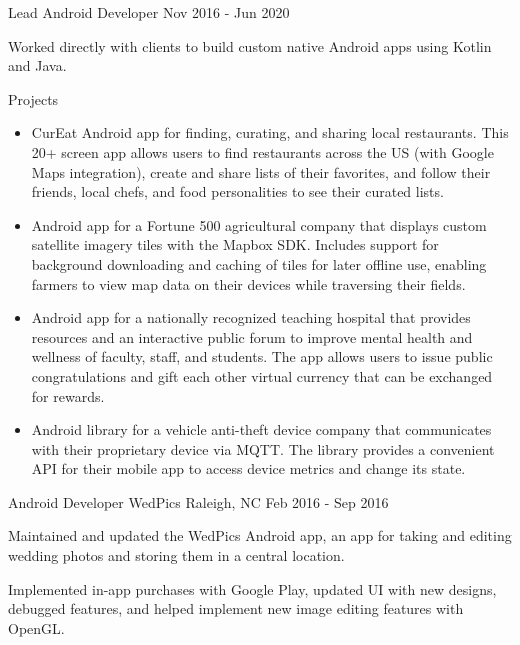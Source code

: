 \begin{cventries}
  \cventry
    {Lead Android Developer} %
    {} %
    {} %
    {Nov 2016 - Jun 2020} %
    {
      \begin{cvitems} %
        \item {Worked directly with clients to build custom native Android apps using Kotlin and Java.}
        \item {Projects
          \begin{itemize}[leftmargin=2ex, nosep, noitemsep]
          \setlength{\parskip}{0pt}
            \item {CurEat Android app for finding, curating, and sharing local restaurants. This 20+ screen app allows users to find restaurants across the US (with Google Maps integration), create and share lists of their favorites, and follow their friends, local chefs, and food personalities to see their curated lists.}
            \item {Android app for a Fortune 500 agricultural company that displays custom satellite imagery tiles with the Mapbox SDK. Includes support for background downloading and caching of tiles for later offline use, enabling farmers to view map data on their devices while traversing their fields.}
            \item {Android app for a nationally recognized teaching hospital that provides resources and an interactive public forum to improve mental health and wellness of faculty, staff, and students. The app allows users to issue public congratulations and gift each other virtual currency that can be exchanged for rewards.}
            \item {Android library for a vehicle anti-theft device company that communicates with their proprietary device via MQTT. The library provides a convenient API for their mobile app to access device metrics and change its state.}
          \end{itemize}}
      \end{cvitems}
    }

  \cventry
    {Android Developer} %
    {WedPics} %
    {Raleigh, NC} %
    {Feb 2016 - Sep 2016} %
    {
      \begin{cvitems} %
        \item {Maintained and updated the WedPics Android app, an app for taking and editing wedding photos and storing them in a central location.}
        \item {Implemented in-app purchases with Google Play, updated UI with new designs, debugged features, and helped implement new image editing features with OpenGL.}
      \end{cvitems}
    }

\end{cventries}
